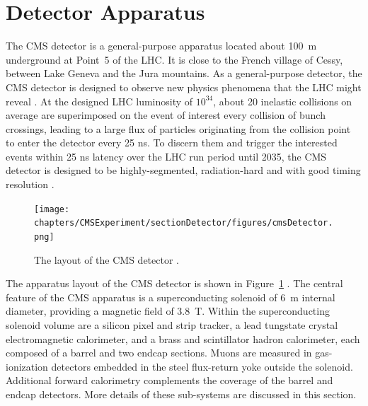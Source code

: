 

\section{Detector Apparatus}
\label{sec:cmsExperiment:detector}



The CMS \cite{exhep:cms:Chatrchyan:2008aa} detector is a general-purpose apparatus located about 100~m underground at Point~5 of the LHC. It is close to the French village of Cessy, between Lake Geneva and the Jura mountains. As a general-purpose detector, the CMS detector is designed to observe new physics phenomena that the LHC might reveal \cite{cms:tdr2:Ball:2007zza}. At the designed LHC luminosity of $10^{34}$\percms, about 20 inelastic collisions on average are superimposed on the event of interest every collision of bunch crossings, leading to a large flux of particles originating from the collision point to enter the detector every 25 ns. To discern them and trigger the interested events within 25 ns latency over the LHC run period until 2035, the CMS detector is designed to be highly-segmented, radiation-hard and with good timing resolution \cite{exhep:cms:Chatrchyan:2008aa}.

\begin{figure}[ht]
    \centering
    \texttt{[image: chapters/CMSExperiment/sectionDetector/figures/cmsDetector.png]}
    \caption{The layout of the CMS detector \cite{cms:detectorOverview}.}
    \label{fig:cmsExperiment:detector:detectorOverview}
\end{figure}

The apparatus layout of the CMS detector is shown in Figure~\ref{fig:cmsExperiment:detector:detectorOverview} \cite{cms:detectorOverview}. The central feature of the CMS apparatus is a superconducting solenoid of 6~m internal diameter, providing a magnetic field of 3.8~T. Within the superconducting solenoid volume are a silicon pixel and strip tracker, a lead tungstate crystal electromagnetic calorimeter, and a brass and scintillator hadron calorimeter, each composed of a barrel and two endcap sections. Muons are measured in gas-ionization detectors embedded in the steel flux-return yoke outside the solenoid. Additional forward calorimetry complements the coverage of the barrel and endcap detectors. More details of these sub-systems are discussed in this section. 


